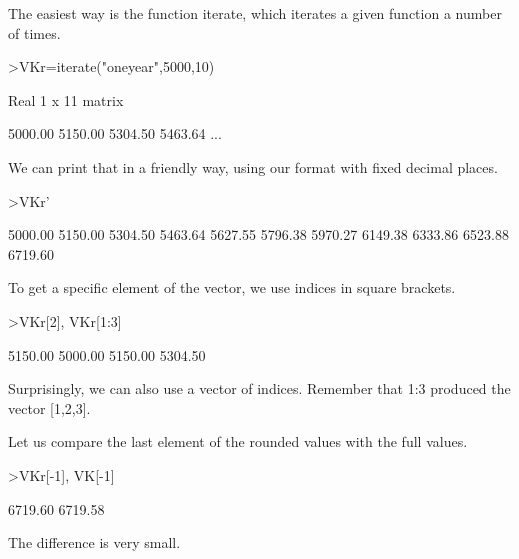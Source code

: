\documentclass{article}
\begin{document}
\begin{eulernotebook}
\begin{eulercomment}
\begin{eulercomment}
\begin{eulercomment}
\begin{eulercomment}
\begin{eulercomment}
\begin{eulercomment}
\begin{eulercomment}
\begin{eulercomment}
\begin{eulercomment}
The easiest way is the function iterate, which iterates a given function a
number of times.
\end{eulercomment}
\begin{eulerprompt}
>VKr=iterate("oneyear",5000,10)
\end{eulerprompt}
\begin{euleroutput}
  Real 1 x 11 matrix
  
      5000.00     5150.00     5304.50     5463.64     ...
\end{euleroutput}
\begin{eulercomment}
We can print that in a friendly way, using our format with fixed decimal
places.
\end{eulercomment}
\begin{eulerprompt}
>VKr'
\end{eulerprompt}
\begin{euleroutput}
      5000.00 
      5150.00 
      5304.50 
      5463.64 
      5627.55 
      5796.38 
      5970.27 
      6149.38 
      6333.86 
      6523.88 
      6719.60 
\end{euleroutput}
\begin{eulercomment}
To get a specific element of the vector, we use indices in square brackets.
\end{eulercomment}
\begin{eulerprompt}
>VKr[2], VKr[1:3]
\end{eulerprompt}
\begin{euleroutput}
      5150.00 
      5000.00     5150.00     5304.50 
\end{euleroutput}
\begin{eulercomment}
Surprisingly, we can also use a vector of indices. Remember that 1:3 produced
the vector [1,2,3].

Let us compare the last element of the rounded values with the full values.
\end{eulercomment}
\begin{eulerprompt}
>VKr[-1], VK[-1]
\end{eulerprompt}
\begin{euleroutput}
      6719.60 
      6719.58 
\end{euleroutput}
\begin{eulercomment}
The difference is very small.


\end{eulercomment}
\end{eulercomment}
\end{eulercomment}
\end{eulercomment}
\end{eulercomment}
\end{eulercomment}
\end{eulercomment}
\end{eulercomment}
\end{eulercomment}
\end{eulernotebook}
\end{document}
